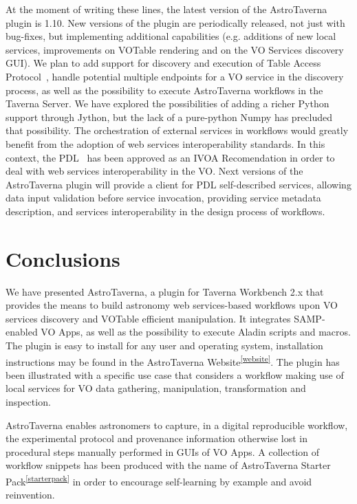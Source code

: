 \documentclass[final,authoryear,5p,times,twocolumn]{elsarticle}
\begin{document}
At the moment of writing these lines, the latest version of the AstroTaverna plugin is 1.10. New versions of the plugin are periodically released, not just with bug-fixes, but implementing additional capabilities (e.g. additions of new local services, improvements on VOTable rendering and on the VO Services discovery GUI). We plan to add support for discovery and execution of Table Access Protocol~\citep[TAP;][]{Dowler2010}, handle potential multiple endpoints for a VO service in the discovery process, as well as the possibility to execute AstroTaverna workflows in the Taverna Server. We have explored the possibilities of adding a richer Python support through Jython, but the lack of a pure-python Numpy has precluded that possibility. The orchestration of external services in workflows would greatly benefit from the adoption of web services interoperability standards. In this context, the PDL~\citep[Parameter Description Language;][]{Zwolf2013} has been approved as an IVOA Recomendation in order to deal with web services interoperability in the VO. Next versions of the AstroTaverna plugin will provide a client for PDL self-described services, allowing data input validation before service invocation, providing service metadata description, and services interoperability in the design process of workflows. 

\section{Conclusions}
\label{Conclusions}

We have presented AstroTaverna, a plugin for Taverna Workbench 2.x that provides the means to build astronomy web services-based workflows upon VO services discovery and VOTable efficient manipulation. It integrates SAMP-enabled VO Apps, as well as the possibility to execute Aladin scripts and macros. The plugin is easy to install for any user and operating system, installation instructions may be found in the
AstroTaverna Website\textsuperscript{\ref{website}}. The plugin has been illustrated with a specific use case that considers a workflow making use of local services for VO data gathering, manipulation, transformation and inspection.

AstroTaverna  enables astronomers to capture, in a digital reproducible workflow, the experimental protocol and provenance information otherwise lost in procedural steps manually performed in GUIs of VO Apps. A collection of workflow snippets has been produced with the name of AstroTaverna Starter Pack\textsuperscript{\ref{starterpack}} in order to encourage self-learning by example and avoid reinvention.
\end{document}
